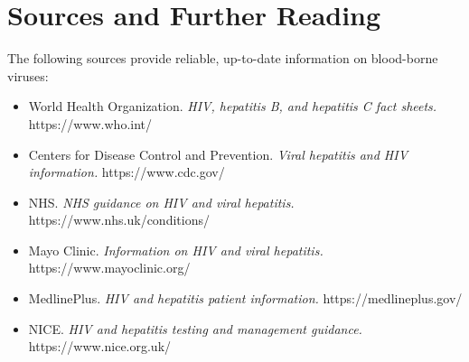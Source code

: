 \section*{Sources and Further Reading}
The following sources provide reliable, up-to-date information on blood-borne viruses:

\begin{itemize}
    \item World Health Organization. \textit{HIV, hepatitis B, and hepatitis C fact sheets.} https://www.who.int/
    \item Centers for Disease Control and Prevention. \textit{Viral hepatitis and HIV information.} https://www.cdc.gov/
    \item NHS. \textit{NHS guidance on HIV and viral hepatitis.} https://www.nhs.uk/conditions/
    \item Mayo Clinic. \textit{Information on HIV and viral hepatitis.} https://www.mayoclinic.org/
    \item MedlinePlus. \textit{HIV and hepatitis patient information.} https://medlineplus.gov/
    \item NICE. \textit{HIV and hepatitis testing and management guidance.} https://www.nice.org.uk/
\end{itemize}

